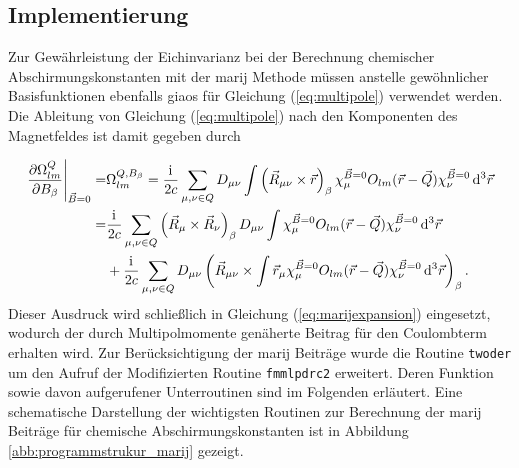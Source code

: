 	\subsection{Implementierung}
Zur Gewährleistung der Eichinvarianz bei der Berechnung chemischer Abschirmungskonstanten mit der \ac{marij} Methode müssen anstelle gewöhnlicher Basisfunktionen ebenfalls \acp{giao} für Gleichung (\ref{eq:multipole}) verwendet werden. Die Ableitung von Gleichung (\ref{eq:multipole}) nach den Komponenten des Magnetfeldes ist damit gegeben durch

	\begin{equation}\label{eq:multipoledb}
	\begin{aligned}
	\left.\frac{\partial \Omega^Q_{lm}}{\partial B_\beta}\right\vert_{\vec{B}=0}=&\Omega^{Q,B_\beta}_{lm}=\frac{\mathrm{i}\mkern1mu}{2c}\sum_{\mu,\nu \in Q}D_{\mu\nu}\int\left(\vec{R}_{\mu\nu}\times\vec{r}\right)_\beta\chi_\mu^{\vec{B}=0} O_{lm}(\vec{r}-\vec{Q})\chi_{\nu}^{\vec{B}=0}\mathop{}\!\mathrm{d^3} \vec{r}\\
	=&\frac{\mathrm{i}\mkern1mu}{2c}\sum_{\mu,\nu \in Q}\left(\vec{R}_{\mu}\times\vec{R}_{\nu}\right)_\beta D_{\mu\nu}\int\chi_\mu^{\vec{B}=0}O_{lm}(\vec{r}-\vec{Q})\chi_{\nu}^{\vec{B}=0}\mathop{}\!\mathrm{d^3}\vec{r}\\
	&+\frac{\mathrm{i}\mkern1mu}{2c}\sum_{\mu,\nu \in Q}D_{\mu\nu}\left(\vec{R}_{\mu\nu}\times\int\vec{r}_{\mu}\chi_\mu^{\vec{B}=0}O_{lm}(\vec{r}-\vec{Q})\chi_{\nu}^{\vec{B}=0}\mathop{}\!\mathrm{d^3}\vec{r}\right)_\beta .
	\end{aligned}
	\end{equation}
	Dieser Ausdruck wird schließlich in Gleichung (\ref{eq:marijexpansion}) eingesetzt, wodurch der durch Multipolmomente genäherte Beitrag für den Coulombterm erhalten wird. Zur Berücksichtigung der \ac{marij} Beiträge wurde die Routine \texttt{twoder} um den Aufruf der Modifizierten Routine \texttt{fmmlpdrc2} erweitert. Deren Funktion sowie davon aufgerufener Unterroutinen sind im Folgenden erläutert. Eine schematische Darstellung der wichtigsten Routinen zur Berechnung der \ac{marij} Beiträge für chemische Abschirmungskonstanten ist in Abbildung \ref{abb:programmstrukur_marij} gezeigt.
